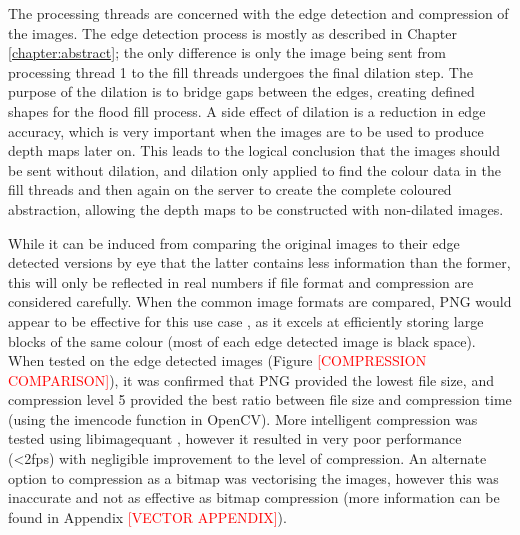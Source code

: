 The processing threads are concerned with the edge detection and compression of the images. The edge detection process is mostly as described in Chapter \ref{chapter:abstract}; the only difference is only the image being sent from processing thread 1 to the fill threads undergoes the final dilation step. The purpose of the dilation is to bridge gaps between the edges, creating defined shapes for the flood fill process. A side effect of dilation is a reduction in edge accuracy, which is very important when the images are to be used to produce depth maps later on. This leads to the logical conclusion that the images should be sent without dilation, and dilation only applied to find the colour data in the fill threads and then again on the server to create the complete coloured abstraction, allowing the depth maps to be constructed with non-dilated images. 

While it can be induced from comparing the original images to their edge detected versions by eye that the latter contains less information than the former, this will only be reflected in real numbers if file format and compression are considered carefully. When the common image formats are compared, PNG would appear to be effective for this use case \cite{aguilera2006comparison}, as it excels at efficiently storing large blocks of the same colour (most of each edge detected image is black space). When tested on the edge detected images (Figure \textcolor{red}{[COMPRESSION COMPARISON]}), it was confirmed that PNG provided the lowest file size, and compression level 5 provided the best ratio between file size and compression time (using the imencode function in OpenCV). More intelligent compression was tested using libimagequant \cite{libimagequant}, however it resulted in very poor performance (\textless2fps) with negligible improvement to the level of compression. An alternate option to compression as a bitmap was vectorising the images, however this was inaccurate and not as effective as bitmap compression (more information can be found in Appendix \textcolor{red}{[VECTOR APPENDIX]}).

